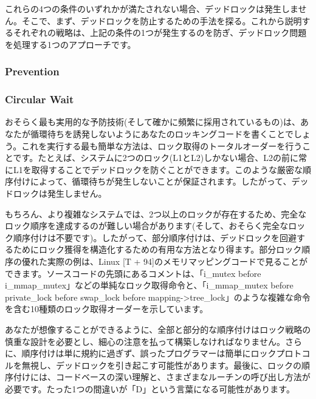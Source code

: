 これらの4つの条件のいずれかが満たされない場合、デッドロックは発生しません。そこで、まず、デッドロックを防止するための手法を探る。これから説明するそれぞれの戦略は、上記の条件の1つが発生するのを防ぎ、デッドロック問題を処理する1つのアプローチです。

\hypertarget{prevention}{%
\subsubsection*{Prevention}\label{prevention}}

\hypertarget{circular-wait}{%
\subsubsection*{Circular Wait}\label{circular-wait}}

おそらく最も実用的な予防技術(そして確かに頻繁に採用されているもの)は、あなたが循環待ちを誘発しないようにあなたのロッキングコードを書くことでしょう。これを実行する最も簡単な方法は、ロック取得のトータルオーダーを行うことです。たとえば、システムに2つのロック(L1とL2)しかない場合、L2の前に常にL1を取得することでデッドロックを防ぐことができます。このような厳密な順序付けによって、循環待ちが発生しないことが保証されます。したがって、デッドロックは発生しません。

もちろん、より複雑なシステムでは、2つ以上のロックが存在するため、完全なロック順序を達成するのが難しい場合があります(そして、おそらく完全なロック順序付けは不要です)。したがって、部分順序付けは、デッドロックを回避するためにロック獲得を構造化するための有用な方法となり得ます。部分ロック順序の優れた実際の例は、Linux
{[}T +
94{]}のメモリマッピングコードで見ることができます。ソースコードの先頭にあるコメントは、「i\_mutex
before i\_mmap\_mutex」などの単純なロック取得命令と、「i\_mmap\_mutex
before private\_lock before swap\_lock before
mapping-\textgreater tree\_lock」のような複雑な命令を含む10種類のロック取得オーダーを示しています。

あなたが想像することができるように、全部と部分的な順序付けはロック戦略の慎重な設計を必要とし、細心の注意を払って構築しなければなりません。さらに、順序付けは単に規約に過ぎず、誤ったプログラマーは簡単にロックプロトコルを無視し、デッドロックを引き起こす可能性があります。最後に、ロックの順序付けには、コードベースの深い理解と、さまざまなルーチンの呼び出し方法が必要です。たった1つの間違いが「D」という言葉になる可能性があります。

